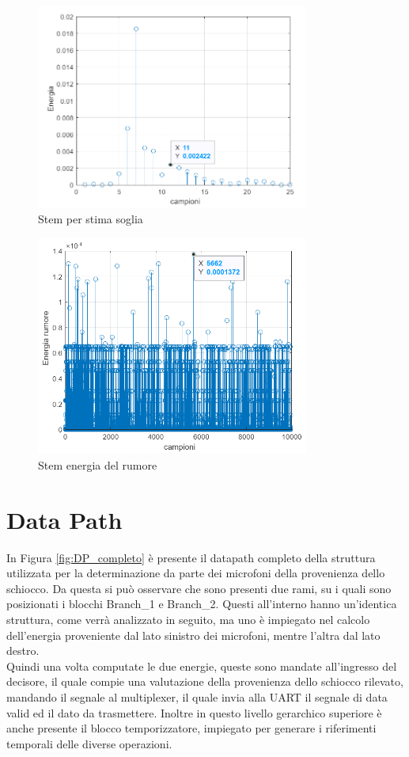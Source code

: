 \documentclass[a4paper, titlepage]{article}
\begin{document}
\begin{figure}[H]
    \centering
    \includegraphics[width=0.8\textwidth]{stem_stima_soglia.PNG}
    \caption{Stem per stima soglia}
    \label{fig:stem stima soglia}
\end{figure}
\begin{figure}[H]
    \centering
    \includegraphics[width=0.8\textwidth]{stem_energia_rumore.PNG}
    \caption{Stem energia del rumore}
    \label{fig:stem energia rumore}
\end{figure}
\section{Data Path}
\label{cap:data_path}
In Figura \ref{fig:DP_completo} è presente il datapath completo della struttura utilizzata per la determinazione da parte dei microfoni della provenienza dello schiocco. Da questa si può osservare che sono presenti due rami, su i quali sono posizionati i blocchi Branch\_1 e Branch\_2. Questi all'interno hanno un'identica struttura, come verrà analizzato in seguito, ma uno è impiegato nel calcolo dell'energia proveniente dal lato sinistro dei microfoni, mentre l'altra dal lato destro.\\Quindi una volta computate le due energie, queste sono mandate all'ingresso del decisore, il quale compie una valutazione della provenienza dello schiocco rilevato, mandando il segnale al multiplexer, il quale invia alla UART il segnale di data valid ed il dato da trasmettere. Inoltre in questo livello gerarchico superiore è anche presente il blocco temporizzatore, impiegato per generare i riferimenti temporali delle diverse operazioni.
\end{document}
